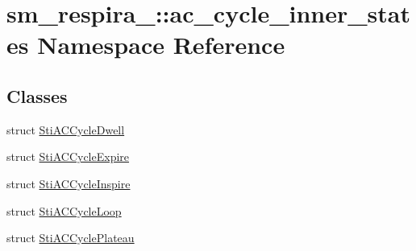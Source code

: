 \hypertarget{namespacesm__respira__1_1_1ac__cycle__inner__states}{}\section{sm\+\_\+respira\+\_\+:\+:ac\+\_\+cycle\+\_\+inner\+\_\+states Namespace Reference}
\label{namespacesm__respira__1_1_1ac__cycle__inner__states}
\subsection*{Classes}
\begin{DoxyCompactItemize}
\item 
struct \hyperlink{structsm__respira__1_1_1ac__cycle__inner__states_1_1StiACCycleDwell}{Sti\+A\+C\+Cycle\+Dwell}
\item 
struct \hyperlink{structsm__respira__1_1_1ac__cycle__inner__states_1_1StiACCycleExpire}{Sti\+A\+C\+Cycle\+Expire}
\item 
struct \hyperlink{structsm__respira__1_1_1ac__cycle__inner__states_1_1StiACCycleInspire}{Sti\+A\+C\+Cycle\+Inspire}
\item 
struct \hyperlink{structsm__respira__1_1_1ac__cycle__inner__states_1_1StiACCycleLoop}{Sti\+A\+C\+Cycle\+Loop}
\item 
struct \hyperlink{structsm__respira__1_1_1ac__cycle__inner__states_1_1StiACCyclePlateau}{Sti\+A\+C\+Cycle\+Plateau}
\end{DoxyCompactItemize}
